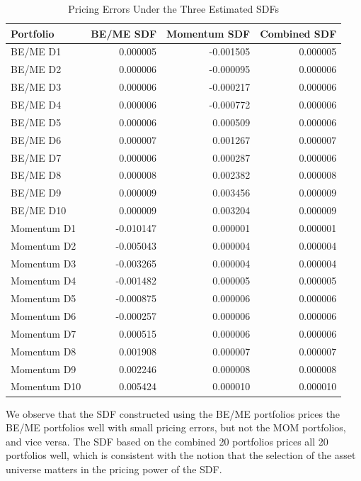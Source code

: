 \documentclass[11pt]{article}
\begin{document}
\begin{table}[H]
  \centering
  \caption{Pricing Errors Under the Three Estimated SDFs}
  \label{tab:2d-pricing-errors}
  \begin{tabular}{lrrr}
    \toprule
    Portfolio & BE/ME SDF & Momentum SDF & Combined SDF \\
    \midrule
    BE/ME D1 & 0.000005 & -0.001505 & 0.000005 \\
    BE/ME D2 & 0.000006 & -0.000095 & 0.000006 \\
    BE/ME D3 & 0.000006 & -0.000217 & 0.000006 \\
    BE/ME D4 & 0.000006 & -0.000772 & 0.000006 \\
    BE/ME D5 & 0.000006 & 0.000509 & 0.000006 \\
    BE/ME D6 & 0.000007 & 0.001267 & 0.000007 \\
    BE/ME D7 & 0.000006 & 0.000287 & 0.000006 \\
    BE/ME D8 & 0.000008 & 0.002382 & 0.000008 \\
    BE/ME D9 & 0.000009 & 0.003456 & 0.000009 \\
    BE/ME D10 & 0.000009 & 0.003204 & 0.000009 \\
    Momentum D1 & -0.010147 & 0.000001 & 0.000001 \\
    Momentum D2 & -0.005043 & 0.000004 & 0.000004 \\
    Momentum D3 & -0.003265 & 0.000004 & 0.000004 \\
    Momentum D4 & -0.001482 & 0.000005 & 0.000005 \\
    Momentum D5 & -0.000875 & 0.000006 & 0.000006 \\
    Momentum D6 & -0.000257 & 0.000006 & 0.000006 \\
    Momentum D7 & 0.000515 & 0.000006 & 0.000006 \\
    Momentum D8 & 0.001908 & 0.000007 & 0.000007 \\
    Momentum D9 & 0.002246 & 0.000008 & 0.000008 \\
    Momentum D10 & 0.005424 & 0.000010 & 0.000010 \\
    \bottomrule
  \end{tabular}
\end{table}

We observe that the SDF constructed using the BE/ME portfolios prices the BE/ME portfolios well with small pricing errors, 
but not the MOM portfolios, and vice versa. The SDF based on the combined 20 portfolios prices 
all 20 portfolios well, which is consistent with the notion that the selection of the asset universe
matters in the pricing power of the SDF. 
\end{document}
